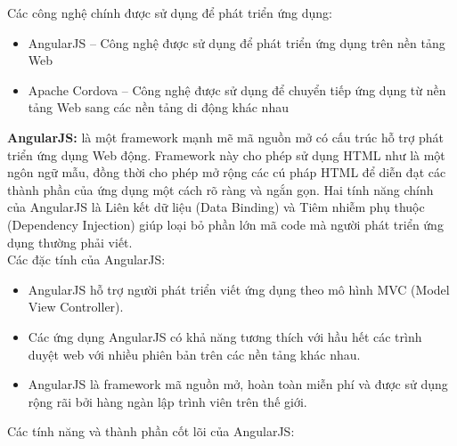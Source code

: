 \documentclass[12pt,a4paper,oneside]{extbook}
\begin{document}
\noindent
Các công nghệ chính được sử dụng để phát triển ứng dụng:
\begin{itemize}[topsep=1mm,itemsep=-0.5mm]
\item AngularJS – Công nghệ được sử dụng để phát triển ứng dụng trên nền tảng Web
\item Apache Cordova – Công nghệ được sử dụng để chuyển tiếp ứng dụng từ nền tảng Web sang các nền tảng di động khác nhau
\vspace{1mm}
\end{itemize}

\noindent
\textbf{AngularJS:} là một framework mạnh mẽ mã nguồn mở có cấu trúc hỗ trợ phát triển ứng dụng Web động. Framework này cho phép sử dụng HTML như là một ngôn ngữ mẫu, đồng thời cho phép mở rộng các cú pháp HTML để diễn đạt các thành phần của ứng dụng một cách rõ ràng và ngắn gọn. Hai tính năng chính của AngularJS là Liên kết dữ liệu (Data Binding) và Tiêm nhiễm phụ thuộc (Dependency Injection) giúp loại bỏ phần lớn mã code mà người phát triển ứng dụng thường phải viết.\\

\noindent
Các đặc tính của AngularJS:
\begin{itemize}[topsep=1mm,itemsep=-0.5mm]
\item AngularJS hỗ trợ người phát triển viết ứng dụng theo mô hình MVC (Model View Controller).
\item Các ứng dụng AngularJS có khả năng tương thích với hầu hết các trình duyệt web với nhiều phiên bản trên các nền tảng khác nhau.
\item AngularJS là framework mã nguồn mở, hoàn toàn miễn phí và được sử dụng rộng rãi bởi hàng ngàn lập trình viên trên thế giới.
\vspace{1mm}
\end{itemize}

\noindent
Các tính năng và thành phần cốt lõi của AngularJS:
\end{document}
